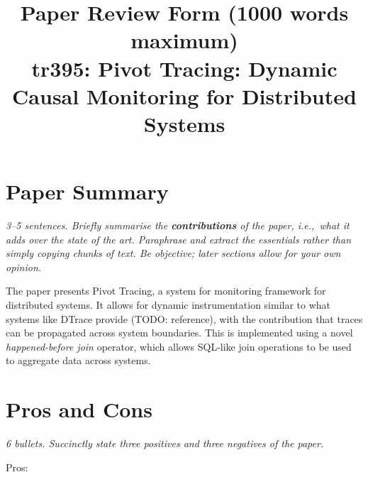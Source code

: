 \documentclass[11pt]{article}
\begin{document}

\title{Paper Review Form (1000 words maximum)\\
    tr395: Pivot Tracing: Dynamic Causal Monitoring for Distributed Systems \cite{PivotTracing}}

\maketitle

\section*{Paper Summary}

\textsl{3--5 sentences. Briefly summarise the {\bf contributions} of the paper,
i.e.,~what it adds over the state of the art. Paraphrase and extract the
essentials rather than simply copying chunks of text. Be objective; later
sections allow for your own opinion.}

The paper presents Pivot Tracing, a system for monitoring framework for
distributed systems. It allows for dynamic instrumentation similar to what
systems like DTrace provide (TODO: reference), with the contribution that
traces can be propagated across system boundaries. This is implemented using a
novel \textit{happened-before join} operator, which allows SQL-like join
operations to be used to aggregate data across systems.

\section*{Pros and Cons}

\textsl{6 bullets. Succinctly state three positives and three negatives of the
paper.}

Pros:
\end{document}
